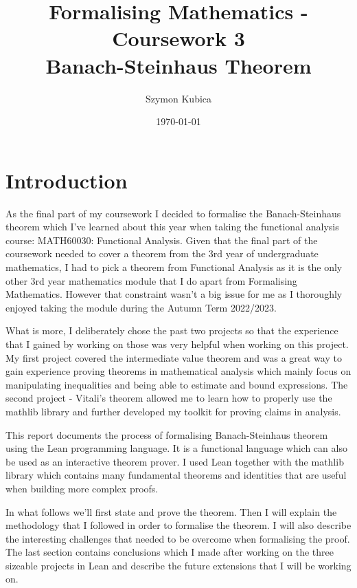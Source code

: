 \documentclass[11pt]{article}
\begin{document}
\title{Formalising Mathematics - Coursework 3 \\ Banach-Steinhaus Theorem}
\date{\today}
\author{Szymon Kubica}
\maketitle

\section*{Introduction}

As the final part of my coursework I decided to formalise the Banach-Steinhaus theorem
which I've learned about this year when taking the functional analysis course:
MATH60030: Functional Analysis. Given that the final part of the coursework needed
to cover a theorem from the 3rd year of undergraduate mathematics, I had to pick
a theorem from Functional Analysis as it is the only other 3rd year mathematics
module that I do apart from Formalising Mathematics. However that constraint wasn't
a big issue for me as I thoroughly enjoyed taking the module during the Autumn Term
2022/2023.

What is more, I deliberately chose the past two projects so that the experience
that I gained by working on those was very helpful when working on this project.
My first project covered the intermediate value theorem and was a great way to
gain experience proving theorems in mathematical analysis which mainly focus on
manipulating inequalities and being able to estimate and bound expressions. The
second project - Vitali's theorem allowed me to learn how to properly use the mathlib
library and further developed my toolkit for proving claims in analysis.

This report documents the process of formalising Banach-Steinhaus theorem using the Lean programming language.
It is a functional language which can also be used as an interactive theorem prover. I used Lean together
with the mathlib library which contains many fundamental theorems and identities that are useful when
building more complex proofs.

In what follows we'll first state and prove the theorem. Then I will explain the
methodology that I followed in order to formalise the theorem. I will also describe
the interesting challenges that needed to be overcome when formalising the proof.
The last section contains conclusions which I made after working on the three sizeable
projects in Lean and describe the future extensions that I will be working on.
\end{document}
